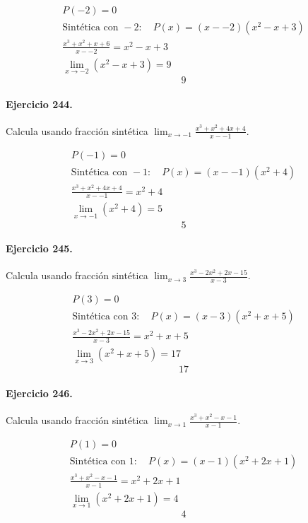 \documentclass[11pt,a4paper]{article}
\begin{document}
\[
\begin{aligned}
P(-2)=0\\
\text{Sintética con }-2:\quad P(x)=(x--2)(x^2 - x + 3)\\
\frac{x^3 + x^2 + x + 6}{x--2}=x^2 - x + 3\\
\lim_{x\to -2}(x^2 - x + 3)=9
\end{aligned}
\]
\[\boxed{9}\]


\paragraph{Ejercicio 244.} Calcula usando fracción sintética $\displaystyle\lim_{x\to -1}\frac{x^3 + x^2 + 4x + 4}{x--1}$. 

\[
\begin{aligned}
P(-1)=0\\
\text{Sintética con }-1:\quad P(x)=(x--1)(x^2 + 4)\\
\frac{x^3 + x^2 + 4x + 4}{x--1}=x^2 + 4\\
\lim_{x\to -1}(x^2 + 4)=5
\end{aligned}
\]
\[\boxed{5}\]


\paragraph{Ejercicio 245.} Calcula usando fracción sintética $\displaystyle\lim_{x\to 3}\frac{x^3 - 2x^2 + 2x - 15}{x-3}$. 

\[
\begin{aligned}
P(3)=0\\
\text{Sintética con }3:\quad P(x)=(x-3)(x^2 + x + 5)\\
\frac{x^3 - 2x^2 + 2x - 15}{x-3}=x^2 + x + 5\\
\lim_{x\to 3}(x^2 + x + 5)=17
\end{aligned}
\]
\[\boxed{17}\]


\paragraph{Ejercicio 246.} Calcula usando fracción sintética $\displaystyle\lim_{x\to 1}\frac{x^3 + x^2 - x - 1}{x-1}$. 

\[
\begin{aligned}
P(1)=0\\
\text{Sintética con }1:\quad P(x)=(x-1)(x^2 + 2x + 1)\\
\frac{x^3 + x^2 - x - 1}{x-1}=x^2 + 2x + 1\\
\lim_{x\to 1}(x^2 + 2x + 1)=4
\end{aligned}
\]
\[\boxed{4}\]
\end{document}
